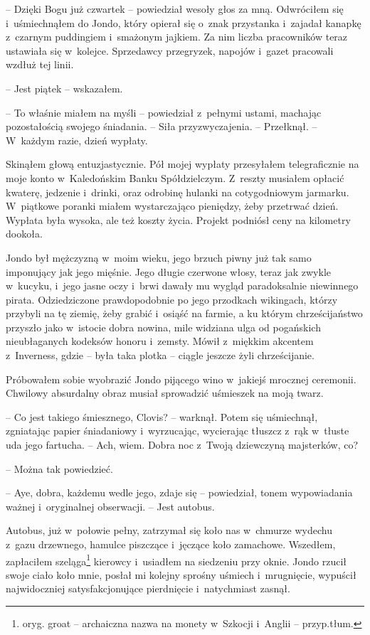 \documentclass[oneside,polish,11pt,sfheadings]{mwbk}
\begin{document}
-- Dzięki Bogu już czwartek -- powiedział wesoły głos za mną. Odwróciłem
się i~uśmiechnąłem do Jondo, który opierał się o~znak przystanka i~zajadał kanapkę z~czarnym puddingiem i~smażonym jajkiem. Za nim liczba
pracowników teraz ustawiała się w~kolejce. Sprzedawcy przegryzek,
napojów i~gazet pracowali wzdłuż tej linii.

-- Jest piątek -- wskazałem.

-- To właśnie miałem na myśli -- powiedział z~pełnymi ustami, machając
pozostałością swojego śniadania. -- Siła przyzwyczajenia. -- Przełknął. -- W~każdym razie, dzień wypłaty.

Skinąłem głową entuzjastycznie. Pół mojej wypłaty przesyłałem
telegraficznie na moje konto w~Kaledońskim Banku Spółdzielczym. Z~reszty
musiałem opłacić kwaterę, jedzenie i~drinki, oraz odrobinę hulanki na
cotygodniowym jarmarku. W~piątkowe poranki miałem wystarczająco
pieniędzy, żeby przetrwać dzień. Wypłata była wysoka, ale też koszty
życia. Projekt podniósł ceny na kilometry dookoła.

Jondo był mężczyzną w~moim wieku, jego brzuch piwny już tak samo
imponujący jak jego mięśnie. Jego długie czerwone włosy, teraz jak
zwykle w~kucyku, i~jego jasne oczy i~brwi dawały mu wygląd paradoksalnie
niewinnego pirata. Odziedziczone prawdopodobnie po jego przodkach
wikingach, którzy przybyli na tę ziemię, żeby grabić i~osiąść na farmie,
a ku którym chrześcijaństwo przyszło jako w~istocie dobra nowina, mile
widziana ulga od pogańskich nieubłaganych kodeksów honoru i~zemsty.
Mówił z~miękkim akcentem z~Inverness, gdzie -- była taka plotka -- ciągle
jeszcze żyli chrześcijanie.

Próbowałem sobie wyobrazić Jondo pijącego wino w~jakiejś mrocznej
ceremonii. Chwilowy absurdalny obraz musiał sprowadzić uśmieszek na moją
twarz.

-- Co jest takiego śmiesznego, Clovis? -- warknął. Potem się uśmiechnął,
zgniatając papier śniadaniowy i~wyrzucając, wycierając tłuszcz z~rąk w~tłuste uda jego fartucha. -- Ach, wiem. Dobra noc z~Twoją dziewczyną
majsterków, co?

-- Można tak powiedzieć.

-- Aye, dobra, każdemu wedle jego, zdaje się -- powiedział, tonem
wypowiadania ważnej i~oryginalnej obserwacji. -- Jest autobus.

Autobus, już w~połowie pełny, zatrzymał się koło nas w~chmurze wydechu z~gazu drzewnego, hamulce piszczące i~jęczące koło zamachowe. Wszedłem,
zapłaciłem szeląga\footnote{oryg. groat -- archaiczna nazwa na monety w~Szkocji i~Anglii -- przyp.tłum.} kierowcy i~usiadłem na siedzeniu przy
oknie. Jondo rzucił swoje ciało koło mnie, posłał mi kolejny sprośny
uśmiech i~mrugnięcie, wypuścił najwidoczniej satysfakcjonujące
pierdnięcie i~natychmiast zasnął.
\end{document}
